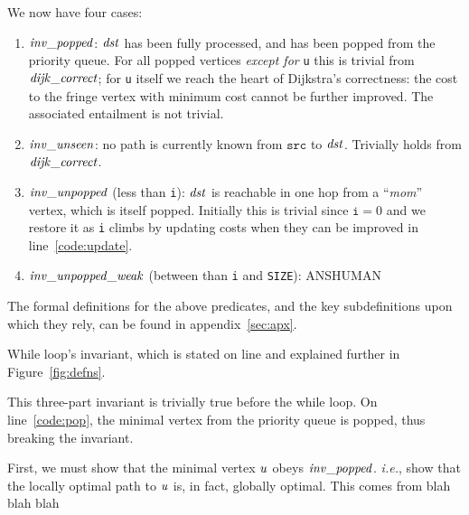 We now have four cases:
\begin{enumerate}
\item $\mathit{inv\_popped}$: $\mathit{dst}$ has been fully processed, and has been
popped from the priority queue.  For all popped vertices \emph{except for} \texttt{u}
this is trivial from $\mathit{dijk\_correct}$; for \texttt{u} itself we reach the heart of Dijkstra's correctness: the cost to the fringe vertex with minimum cost cannot be further improved.  The associated entailment is not trivial.
\item $\mathit{inv\_unseen}$: no path is currently known from $\texttt{src}$ to $\mathit{dst}$.  Trivially holds from $\mathit{dijk\_correct}$.
\item $\mathit{inv\_unpopped}$ (less than \texttt{i}): $\mathit{dst}$ is reachable in
one hop from a ``\emph{mom}'' vertex, which is itself popped.  Initially this is trivial since $\texttt{i}=0$ and we restore it as \texttt{i} climbs by updating costs when they can be improved in line~\ref{code:update}.
\item $\mathit{inv\_unpopped\_weak}$ (between than \texttt{i} and \texttt{SIZE}): ANSHUMAN
\end{enumerate}
The formal definitions for the above predicates, and the key subdefinitions upon which they rely, can be found in appendix~\ref{sec:apx}.



While loop's invariant, which is stated on line
and explained further in Figure~\ref{fig:defns}.


This three-part invariant is trivially true before the while loop.
On line~\ref{code:pop}, the minimal vertex from the priority queue is popped,
thus breaking the invariant.

First, we must show that the minimal vertex $\mathit{u}$
obeys $\mathit{inv\_popped}$. \emph{i.e.}, show that the locally
optimal path to $\mathit{u}$ is, in fact, globally optimal.
This comes from blah blah blah

